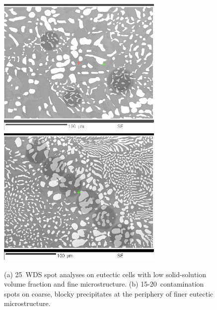 %
\begin{figure}[htbp]
\begin{center}
\includegraphics[width=8cm]{manual12_8to11}
\includegraphics[width=8cm]{manual11_line2_50um}
\caption{(a) 25\micro\metre\ WDS spot analyses on eutectic cells with low solid-solution volume fraction and fine microstructure.  (b) 15-20\micro\meter\ contamination spots on coarse, blocky precipitates at the periphery of finer eutectic microstructure.}\label{fig:low_vol_frac}
\end{center}
\end{figure}
%
%
%

